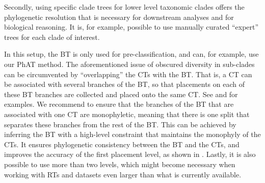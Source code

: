 
Secondly, using specific clade trees for lower level taxonomic clades offers the phylogenetic resolution
that is necessary for downstream analyses and for biological reasoning.
It is, for example, possible to use manually curated ``expert'' trees for each clade of interest.

In this setup, the \ac{BT} is only used for pre-classification,
and can, for example, use our \ac{PhAT} method.
The aforementioned issue of obscured diversity in sub-clades can be circumvented
by ``overlapping'' the \acp{CT} with the \ac{BT}.
That is, a \ac{CT} can be associated with several branches of the \ac{BT},
so that placements on each of these \ac{BT} branches are collected and placed onto the same \ac{CT}.
See  and  for examples.
We recommend to ensure that the branches of the \ac{BT} that are associated with one \ac{CT} are monophyletic,
meaning that there is one split that separates these branches from the rest of the \ac{BT}.
This can be achieved by inferring the \ac{BT} with a high-level constraint that maintains the monophyly of the \acp{CT}.
It ensures phylogenetic consistency between the \ac{BT} and the \acp{CT},
and improves the accuracy of the first placement level, as shown in .
Lastly, it is also possible to use more than two levels,
which might become necessary when working with \acp{RT} and datasets even larger than what is currently available.

